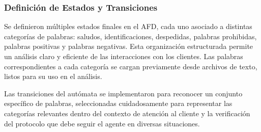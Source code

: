 \subsubsection{Definición de Estados y Transiciones}

Se definieron múltiples estados finales en el AFD, cada uno asociado a distintas categorías de
palabras: saludos, identificaciones, despedidas, palabras prohibidas, palabras positivas y
palabras negativas. Esta organización estructurada permite un análisis claro y eficiente de las
interacciones con los clientes. Las palabras correspondientes a cada categoría se cargan
previamente desde archivos de texto, listos para su uso en el análisis.

Las transiciones del autómata se implementaron para reconocer un conjunto específico de
palabras, seleccionadas cuidadosamente para representar las categorías relevantes dentro del
contexto de atención al cliente y la verificación del protocolo que debe seguir el agente en
diversas situaciones.

